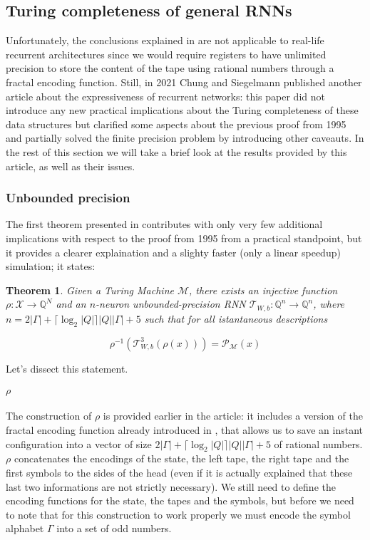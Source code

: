 \documentclass{article}
\newtheorem{theorem}{Theorem}
\begin{document}
\subsection{Turing completeness of general RNNs}

Unfortunately, the conclusions explained in \cite{SIE95} are not applicable to real-life recurrent architectures since we would require registers to have unlimited precision to store the content of the tape using rational numbers through a fractal encoding function.
Still, in 2021 Chung and Siegelmann published another article \cite{CHU21} about the expressiveness of recurrent networks: this paper did not introduce any new practical implications about the Turing completeness of these data structures but clarified some aspects about the previous proof from 1995 and partially solved the finite precision problem by introducing other caveauts. In the rest of this section we will take a brief look at the results provided by this article, as well as their issues.

\subsubsection{Unbounded precision}

The first theorem presented in \cite{CHU21} contributes with only very few additional implications with respect to the proof from 1995 from a practical standpoint, but it provides a clearer explaination and a slighty faster (only a linear speedup) simulation; it states:

\begin{theorem}\label{th:theorem1}
    Given a Turing Machine $\mathcal{M}$, there exists an injective function $\rho: \mathcal{X} \rightarrow \mathbb{Q}^N$ and an $n$-neuron unbounded-precision RNN $\mathcal{T}_{W,b}: \mathbb{Q}^n \rightarrow \mathbb{Q}^n$, where $n=2|\Gamma|+\lceil \log_2|Q|\rceil |Q||\Gamma| + 5$ such that for all istantaneous descriptions
    
    $$\rho^{-1}(\mathcal{T}^3_{W,b}(\rho(x))) = \mathcal{P}_{\mathcal{M}}(x)$$
\end{theorem}

Let's dissect this statement.

\paragraph{$\rho$}
The construction of $\rho$ is provided earlier in the article: it includes a version of the fractal encoding function already introduced in \cite{SIE95}, that allows us to save an instant configuration into a vector of size $2|\Gamma|+\lceil \log_2|Q|\rceil |Q||\Gamma| + 5$ of rational numbers. $\rho$ concatenates the encodings of the state, the left tape, the right tape and the first symbols to the sides of the head (even if it is actually explained that these last two informations are not strictly necessary). We still need to define the encoding functions for the state, the tapes and the symbols, but before we need to note that for this construction to work properly we must encode the symbol alphabet $\Gamma$ into a set of odd numbers.
\end{document}
